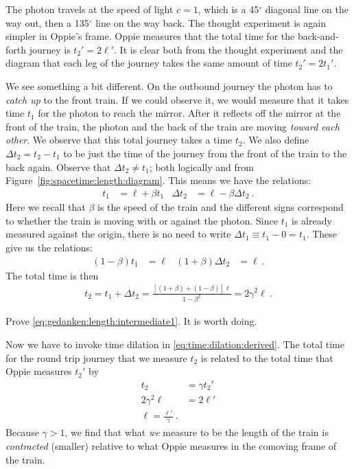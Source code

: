 \begin{subappendices}
The photon travels at the speed of light $c=1$, which is a 45$^\circ$ diagonal line on the way out, then a 135$^\circ$ line on the way back. The thought experiment is again simpler in Oppie's frame. Oppie measures that the total time for the back-and-forth journey is $t_2' = 2\ell'$. It is clear both from the thought experiment and the diagram that each leg of the journey takes the same amount of time $t_2' = 2t_1'$.

We see something a bit different. On the outbound journey the photon has to \emph{catch up} to the front train. If we could observe it, we would measure that it takes time $t_1$ for the photon to reach the mirror. After it reflects off the mirror at the front of the train, the photon and the back of the train are moving \emph{toward each other}. We observe that this total journey takes a time $t_2$. We also define $\Delta t_2 = t_2 - t_1$ to be just the time of the journey from the front of the train to the back again. Observe that $\Delta t_2 \neq t_1$; both logically and from Figure~\ref{fig:spacetime:length:diagram}. This means we have the relations:
\begin{align}
t_1 &= \ell + \beta t_1
&
\Delta t_2 &= \ell - \beta \Delta t_2 \ .
\end{align}
Here we recall that $\beta$ is the speed of the train and the different signs correspond to whether the train is moving with or against the photon. Since $t_1$ is already measured against the origin, there is no need to write $\Delta t_1 \equiv t_1 - 0 = t_1$. These give us the relations:
\begin{align}
    (1-\beta)t_1 &= \ell & (1+\beta)\Delta t_2 &= \ell
    \ .
\end{align}
The total time is then
\begin{align}
    t_2 = t_1 + \Delta t_2 = \frac{\left[(1 + \beta) + (1-\beta)\right]\ell}{1-\beta^2}
    = 2\gamma^2 \ell \ .
    \label{eq:gedanken:length:intermediate1}
\end{align}
\begin{exercise}
Prove \eqref{eq:gedanken:length:intermediate1}. It is worth doing.
\end{exercise}
Now we have to invoke time dilation in \eqref{eq:time:dilation:derived}. The total time for the round trip journey that we measure $t_2$ is related to the total time that Oppie measures $t_2'$ by
\begin{align}
    t_2 &= \gamma t_2'
    \\
    2\gamma^2 \ell &= 2\ell' 
    \\
    \ell = \frac{\ell'}{\gamma}
    \label{eq:length:contraction:derived}
    \ .
\end{align}
Because $\gamma > 1$, we find that what \emph{we} measure to be the length of the train is \emph{contracted} (smaller) relative to what Oppie measures in the comoving frame of the train.



\end{subappendices}
